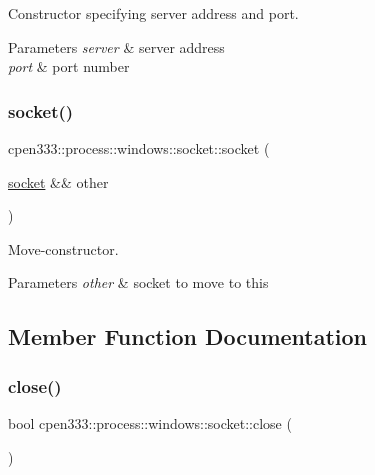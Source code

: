 Constructor specifying server address and port. 


\begin{DoxyParams}{Parameters}
{\em server} & server address \\
\hline
{\em port} & port number \\
\hline
\end{DoxyParams}
\mbox{\label{classcpen333_1_1process_1_1windows_1_1socket_a5f52500d16f2c98de9ba0de9ec94224a}} 
\subsubsection{\texorpdfstring{socket()}{socket()}\hspace{0.1cm}{\footnotesize\ttfamily [2/2]}}
{\footnotesize\ttfamily cpen333\+::process\+::windows\+::socket\+::socket (\begin{DoxyParamCaption}\item[{\hyperlink{classcpen333_1_1process_1_1windows_1_1socket}{socket} \&\&}]{other }\end{DoxyParamCaption})\hspace{0.3cm}{\ttfamily [inline]}}



Move-\/constructor. 


\begin{DoxyParams}{Parameters}
{\em other} & socket to move to this \\
\hline
\end{DoxyParams}


\subsection{Member Function Documentation}
\mbox{\label{classcpen333_1_1process_1_1windows_1_1socket_a27d44e55f1159dec27f5dc02f429ae8c}} 
\subsubsection{\texorpdfstring{close()}{close()}}
{\footnotesize\ttfamily bool cpen333\+::process\+::windows\+::socket\+::close (\begin{DoxyParamCaption}{ }\end{DoxyParamCaption})\hspace{0.3cm}{\ttfamily [inline]}}



